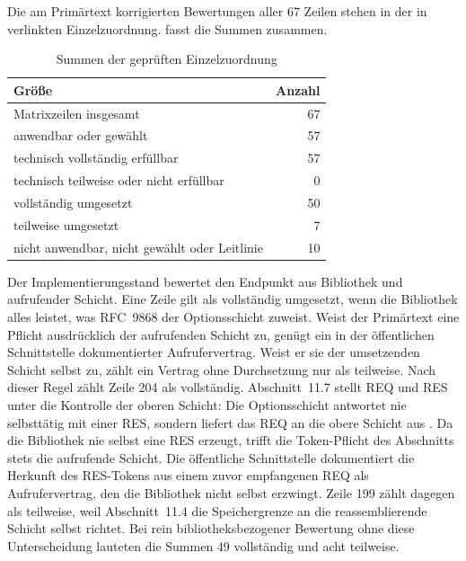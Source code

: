 Die am Primärtext korrigierten Bewertungen aller 67 Zeilen stehen in der in
 verlinkten Einzelzuordnung.  fasst die Summen
zusammen.

\begin{table}[H]
    \centering
    \caption{Summen der geprüften Einzelzuordnung}
    \label{tab:eval-sollist-summe}
    \small
    \begin{tabularx}{\textwidth}{@{}Yr@{}}
        \toprule
        \textbf{Größe} & \textbf{Anzahl} \\
        \midrule
        Matrixzeilen insgesamt & 67 \\
        anwendbar oder gewählt & 57 \\
        \midrule
        technisch vollständig erfüllbar & 57 \\
        technisch teilweise oder nicht erfüllbar & 0 \\
        \midrule
        vollständig umgesetzt & 50 \\
        teilweise umgesetzt & 7 \\
        nicht anwendbar, nicht gewählt oder Leitlinie & 10 \\
        \bottomrule
    \end{tabularx}
\end{table}

Der Implementierungs\-stand bewertet den Endpunkt aus Bibliothek und aufrufender Schicht. Eine
Zeile gilt als vollständig umgesetzt, wenn die Bibliothek alles leistet, was RFC~9868 der Optionsschicht
zuweist. Weist der Primärtext eine Pflicht ausdrücklich der aufrufenden Schicht zu, genügt ein in der
öffentlichen Schnittstelle dokumentierter Aufrufervertrag. Weist er sie der umsetzenden Schicht selbst zu,
zählt ein Vertrag ohne Durchsetzung nur als teilweise. Nach dieser Regel zählt Zeile 204 als vollständig.
Abschnitt~11.7 stellt REQ und RES unter die Kontrolle der oberen Schicht: Die Optionsschicht antwortet nie
selbsttätig mit einer RES, sondern liefert das REQ an die obere Schicht aus \cite[Sec.~11.7]{rfc9868}. Da
die Bibliothek nie selbst eine RES erzeugt, trifft die Token-Pflicht des Abschnitts stets die aufrufende
Schicht. Die öffentliche Schnittstelle dokumentiert die Herkunft des RES-Tokens aus einem zuvor
empfangenen REQ als Aufrufervertrag, den die Bibliothek nicht selbst erzwingt. Zeile 199 zählt dagegen als
teilweise, weil
Abschnitt~11.4 die Speichergrenze
an die reassemblierende Schicht selbst richtet. Bei rein bibliotheksbezogener Bewertung ohne diese
Unterscheidung lauteten die Summen 49 vollständig und acht teilweise.

